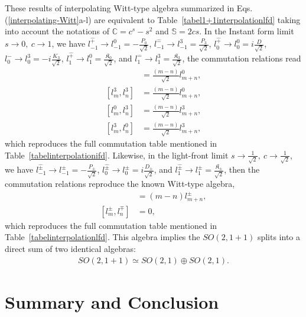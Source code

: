 \documentclass[%
 reprint,
superscriptaddress,
 amsmath,amssymb,
 aps,
]{revtex4-2}
\begin{document}
These results of interpolating Witt-type algebra summarized in Eqs.(\ref{interpolating-Witt}a-l) are equivalent to Table~\ref{tabel1+1interpolationlfd} taking into account the notations of 
$\mathbb{C} = c^s -s^2$ and $\mathbb{S} = 2 cs$. 
In the Instant form limit $s\rightarrow0,~c\rightarrow1$, we have  $l^{\hat{+}}_{-1}\rightarrow l^{0}_{-1}=-\frac{P_{0}}{\sqrt{2}}$, $l^{\hat{-}}_{-1}\rightarrow l^{3}_{-1}= \frac{P_{3}}{\sqrt{2}}$, $l^{\hat{+}}_{0}\rightarrow l^{0}_{0}=i\frac{D}{\sqrt{2}}$, 
$l^{\hat{-}}_{0}\rightarrow l^{3}_{0}= -i\frac{K_{3}}{\sqrt{2}}$, $l^{\hat{+}}_{1}\rightarrow l^{0}_{1}= \frac{\mathfrak{K}_{0}}{\sqrt{2}}$, and $l^{\hat{-}}_{1}\rightarrow l^{3}_{1}= \frac{\mathfrak{K}_{3}}{\sqrt{2}}$, the commutation relations read
 \begin{align}
    [l^{0}_m,l^{0}_n]&=\frac{(m-n)}{\sqrt{2}}l^{0}_{m+n},\\
    [l^{3}_m,l^{3}_n]&=\frac{(m-n)}{\sqrt{2}}l^{0}_{m+n},\\
    [l^{0}_m,l^{3}_n]&=\frac{(m-n)}{\sqrt{2}}l^{3}_{m+n},\\
    [l^{3}_m,l^{0}_n]&=\frac{(m-n)}{\sqrt{2}}l^{3}_{m+n},
\end{align}
which reproduces the full commutation table mentioned in Table~\ref {tabelinterpolationifd}.
%
Likewise, 
in the light-front limit $s\rightarrow\frac{1}{\sqrt{2}},~c\rightarrow\frac{1}{\sqrt{2}}$, we have $ l^{\hat{\pm}}_{-1}\rightarrow l^{\pm}_{-1}=-\frac{P_{\pm}}{\sqrt{2}}$, $l^{\hat{\pm}}_{0}\rightarrow l^{\pm}_{0}=i\frac{D_{\pm}}{\sqrt{2}}$, and $l^{\hat{\pm}}_{1}\rightarrow l^{\pm}_{1}= \frac{\mathfrak{K}_{\pm}}{\sqrt{2}}$, then the commutation relations reproduce the known Witt-type algebra,
\begin{align}
    [l^{\pm}_m,l^{\pm}_n]&=(m-n)l^{\pm}_{m+n},\\
    [l^{\pm}_m,l^{\mp}_n]&=0,
\end{align}
which reproduces the full commutation table mentioned in Table~\ref {tabelinterpolationlfd}. This algebra implies the $SO(2,1+1)$ splits into a direct sum of two identical algebras:
\begin{align}
    SO(2,1+1)\simeq SO(2,1)\oplus SO(2,1).
\end{align}




\section{Summary and Conclusion}
\label{summary-conclusion}
\end{document}
